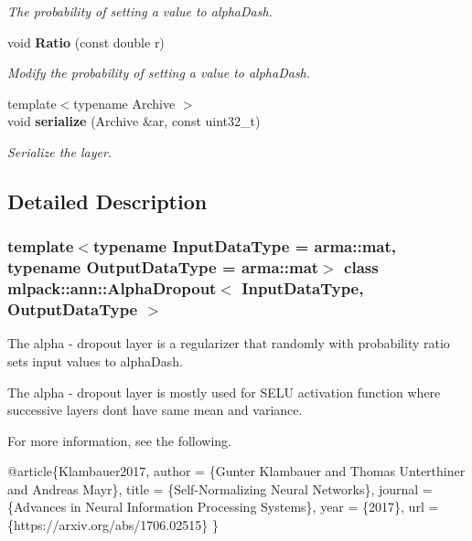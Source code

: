 \begin{DoxyCompactItemize}
\begin{DoxyCompactList}\small\item\em The probability of setting a value to alpha\+Dash. \end{DoxyCompactList}\item 
void \textbf{ Ratio} (const double r)
\begin{DoxyCompactList}\small\item\em Modify the probability of setting a value to alpha\+Dash. \end{DoxyCompactList}\item 
{\footnotesize template$<$typename Archive $>$ }\\void \textbf{ serialize} (Archive \&ar, const uint32\+\_\+t)
\begin{DoxyCompactList}\small\item\em Serialize the layer. \end{DoxyCompactList}\end{DoxyCompactItemize}


\subsection{Detailed Description}
\subsubsection*{template$<$typename Input\+Data\+Type = arma\+::mat, typename Output\+Data\+Type = arma\+::mat$>$\newline
class mlpack\+::ann\+::\+Alpha\+Dropout$<$ Input\+Data\+Type, Output\+Data\+Type $>$}

The alpha -\/ dropout layer is a regularizer that randomly with probability \textquotesingle{}ratio\textquotesingle{} sets input values to alpha\+Dash. 

The alpha -\/ dropout layer is mostly used for S\+E\+LU activation function where successive layers don\textquotesingle{}t have same mean and variance.

For more information, see the following.


\begin{DoxyCode}
@article\{Klambauer2017,
  author  = \{Gunter Klambauer and Thomas Unterthiner and
             Andreas Mayr\},
  title   = \{Self-Normalizing Neural Networks\},
  journal = \{Advances in Neural Information Processing Systems\},
  year    = \{2017\},
  url     = \{https:\textcolor{comment}{//arxiv.org/abs/1706.02515\}}
\}
\end{DoxyCode}



